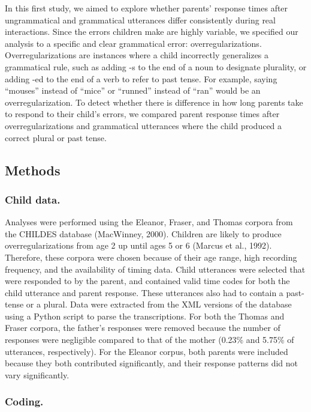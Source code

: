 \documentclass[10pt, letterpaper]{article}
\begin{document}
In this first study, we aimed to explore whether parents' response times
after ungrammatical and grammatical utterances differ consistently
during real interactions. Since the errors children make are highly
variable, we specified our analysis to a specific and clear grammatical
error: overregularizations. Overregularizations are instances where a
child incorrectly generalizes a grammatical rule, such as adding -s to
the end of a noun to designate plurality, or adding -ed to the end of a
verb to refer to past tense. For example, saying ``mouses'' instead of
``mice'' or ``runned'' instead of ``ran'' would be an
overregularization. To detect whether there is difference in how long
parents take to respond to their child's errors, we compared parent
response times after overregularizations and grammatical utterances
where the child produced a correct plural or past tense.

\hypertarget{methods}{%
\subsection{Methods}\label{methods}}

\hypertarget{child-data.}{%
\subsubsection{Child data.}\label{child-data.}}

Analyses were performed using the Eleanor, Fraser, and Thomas corpora
from the CHILDES database (MacWinney, 2000). Children are likely to
produce overregularizations from age 2 up until ages 5 or 6 (Marcus et
al., 1992). Therefore, these corpora were chosen because of their age
range, high recording frequency, and the availability of timing data.
Child utterances were selected that were responded to by the parent, and
contained valid time codes for both the child utterance and parent
response. These utterances also had to contain a past-tense or a plural.
Data were extracted from the XML versions of the database using a Python
script to parse the transcriptions. For both the Thomas and Fraser
corpora, the father's responses were removed because the number of
responses were negligible compared to that of the mother (0.23\% and
5.75\% of utterances, respectively). For the Eleanor corpus, both
parents were included because they both contributed significantly, and
their response patterns did not vary significantly.

\hypertarget{coding.}{%
\subsubsection{Coding.}\label{coding.}}
\end{document}
